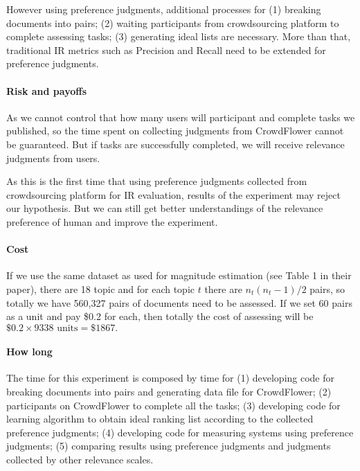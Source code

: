\documentclass{article}
\begin{document}
However using preference judgments, additional processes for (1) breaking documents into pairs; (2) waiting participants from crowdsourcing platform to complete assessing tasks; (3) generating ideal lists are necessary. More than that, traditional IR metrics such as Precision and Recall need to be extended for preference judgments.

\paragraph{Risk and payoffs}
As we cannot control that how many users will participant and complete tasks we published, so the time spent on collecting judgments from CrowdFlower cannot be guaranteed. But if tasks are successfully completed, we will receive relevance judgments from users. 

As this is the first time that using preference judgments collected from crowdsourcing platform for IR evaluation, results of the experiment may reject our hypothesis. But we can still get better understandings of the relevance preference of human and improve the experiment.
\paragraph{Cost} If we use the same dataset as \citet{benefits.ME} used for magnitude estimation (see Table 1 in their paper), there are 18 topic and for each topic $t$ there are $n_t(n_t-1)/2$ pairs, so totally we have 560,327 pairs of documents need to be assessed. If we set 60 pairs as a unit and pay \$0.2 for each, then totally the cost of assessing will be $\$0.2\times9338\text{ units}= \$1867.$ 


\paragraph{How long} The time for this experiment is composed by time for (1) developing code for breaking documents into pairs and generating data file for CrowdFlower; (2) participants on CrowdFlower to complete all the tasks; (3) developing code for learning algorithm to obtain ideal ranking list according to the collected preference judgments; (4) developing code for measuring systems using preference judgments; (5) comparing results using preference judgments and judgments collected by other relevance scales.
\end{document}
